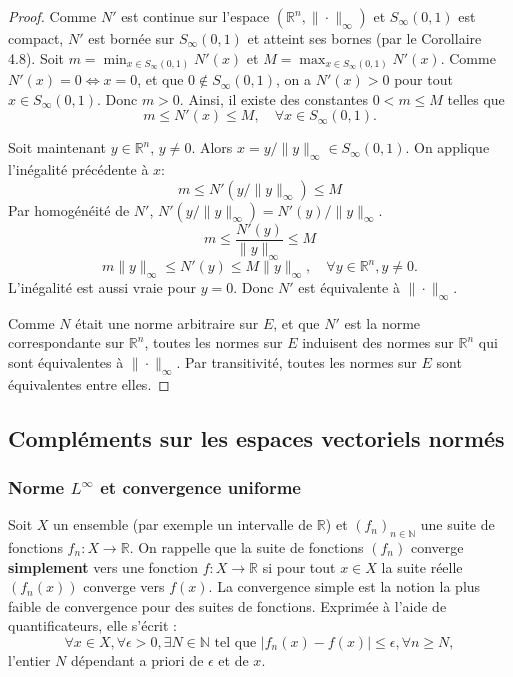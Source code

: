 \documentclass{article}
\newcommand{\R}{\mathbb{R}}
\newcommand{\N}{\mathbb{N}}
\begin{document}
\begin{proof}
Comme $N'$ est continue sur l'espace $(\R^n, \|\cdot\|_\infty)$ et $S_\infty(0, 1)$ est compact, $N'$ est bornée sur $S_\infty(0, 1)$ et atteint ses bornes (par le Corollaire 4.8).
Soit $m = \min_{x \in S_\infty(0, 1)} N'(x)$ et $M = \max_{x \in S_\infty(0, 1)} N'(x)$.
Comme $N'(x) = 0 \iff x = 0$, et que $0 \notin S_\infty(0, 1)$, on a $N'(x) > 0$ pour tout $x \in S_\infty(0, 1)$. Donc $m > 0$.
Ainsi, il existe des constantes $0 < m \leq M$ telles que
\[ m \leq N'(x) \leq M, \quad \forall x \in S_\infty(0, 1). \]

Soit maintenant $y \in \R^n$, $y \neq 0$. Alors $x = y / \|y\|_\infty \in S_\infty(0, 1)$.
On applique l'inégalité précédente à $x$:
\[ m \leq N'(y / \|y\|_\infty) \leq M \]
Par homogénéité de $N'$, $N'(y / \|y\|_\infty) = N'(y) / \|y\|_\infty$.
\[ m \leq \frac{N'(y)}{\|y\|_\infty} \leq M \]
\[ m \|y\|_\infty \leq N'(y) \leq M \|y\|_\infty, \quad \forall y \in \R^n, y \neq 0. \]
L'inégalité est aussi vraie pour $y = 0$.
Donc $N'$ est équivalente à $\|\cdot\|_\infty$.

Comme $N$ était une norme arbitraire sur $E$, et que $N'$ est la norme correspondante sur $\R^n$, toutes les normes sur $E$ induisent des normes sur $\R^n$ qui sont équivalentes à $\|\cdot\|_\infty$. Par transitivité, toutes les normes sur $E$ sont équivalentes entre elles.
\end{proof}

\subsection{Compléments sur les espaces vectoriels normés}
\subsubsection{Norme $L^\infty$ et convergence uniforme}
Soit $X$ un ensemble (par exemple un intervalle de $\R$) et $(f_n)_{n \in \N}$ une suite de fonctions $f_n : X \to \R$.
On rappelle que la suite de fonctions $(f_n)$ converge \textbf{simplement} vers une fonction $f : X \to \R$ si pour tout $x \in X$ la suite réelle $(f_n(x))$ converge vers $f(x)$. La convergence simple est la notion la plus faible de convergence pour des suites de fonctions. Exprimée à l'aide de quantificateurs, elle s'écrit :
\begin{equation} \label{eq:conv_simple}
\forall x \in X, \forall \epsilon > 0, \exists N \in \N \text{ tel que } |f_n(x) - f(x)| \leq \epsilon, \forall n \geq N,
\end{equation}
l'entier $N$ dépendant a priori de $\epsilon$ et de $x$.
\end{document}
